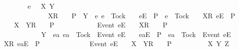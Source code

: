 \begin{isabellebody}
\ \ \ \ \ \ \ {\isacharparenleft}{\isasymAnd}e\ {\isasymrho}\ {\isasymsigma}\ X\ Y{\isachardot}\isanewline
\ \ \ \ \ \ \ \ \ \ \ {\isacharparenleft}{\isasymrho}\ {\isacharat}\ {\isacharbrackleft}X{\isacharbrackright}\isactrlsub R\ {\isacharhash}\ {\isasymsigma}\ {\isasymin}\ P\ {\isasymand}\ Y\ {\isasyminter}\ {\isacharbraceleft}e{\isachardot}\ e\ {\isasymnoteq}\ Tock\ {\isasymand}\ {\isasymrho}\ {\isacharat}\ {\isacharbrackleft}{\isacharbrackleft}e{\isacharbrackright}\isactrlsub E{\isacharbrackright}\ {\isasymin}\ P\ {\isasymor}\ e\ {\isacharequal}\ Tock\ {\isasymand}\ {\isasymrho}\ {\isacharat}\ {\isacharbrackleft}{\isacharbrackleft}X{\isacharbrackright}\isactrlsub R{\isacharcomma}\ {\isacharbrackleft}e{\isacharbrackright}\isactrlsub E{\isacharbrackright}\ {\isasymin}\ P{\isacharbraceright}\ {\isacharequal}\ {\isacharbraceleft}{\isacharbraceright}\ {\isasymLongrightarrow}\ {\isasymrho}\ {\isacharat}\ {\isacharbrackleft}X\ {\isasymunion}\ Y{\isacharbrackright}\isactrlsub R\ {\isacharhash}\ {\isasymsigma}\ {\isasymin}\ P{\isacharparenright}\ {\isasymLongrightarrow}\isanewline
\ \ \ \ \ \ \ \ \ \ \ {\isacharbrackleft}Event\ e{\isacharbrackright}\isactrlsub E\ {\isacharhash}\ {\isasymrho}\ {\isacharat}\ {\isacharbrackleft}X{\isacharbrackright}\isactrlsub R\ {\isacharhash}\ {\isasymsigma}\ {\isasymin}\ P\ {\isasymand}\isanewline
\ \ \ \ \ \ \ \ \ \ \ Y\ {\isasyminter}\ {\isacharbraceleft}ea{\isachardot}\ ea\ {\isasymnoteq}\ Tock\ {\isasymand}\ {\isacharbrackleft}Event\ e{\isacharbrackright}\isactrlsub E\ {\isacharhash}\ {\isasymrho}\ {\isacharat}\ {\isacharbrackleft}{\isacharbrackleft}ea{\isacharbrackright}\isactrlsub E{\isacharbrackright}\ {\isasymin}\ P\ {\isasymor}\ ea\ {\isacharequal}\ Tock\ {\isasymand}\ {\isacharbrackleft}Event\ e{\isacharbrackright}\isactrlsub E\ {\isacharhash}\ {\isasymrho}\ {\isacharat}\ {\isacharbrackleft}{\isacharbrackleft}X{\isacharbrackright}\isactrlsub R{\isacharcomma}\ {\isacharbrackleft}ea{\isacharbrackright}\isactrlsub E{\isacharbrackright}\ {\isasymin}\ P{\isacharbraceright}\ {\isacharequal}\ {\isacharbraceleft}{\isacharbraceright}\ {\isasymLongrightarrow}\isanewline
\ \ \ \ \ \ \ \ \ \ \ {\isacharbrackleft}Event\ e{\isacharbrackright}\isactrlsub E\ {\isacharhash}\ {\isasymrho}\ {\isacharat}\ {\isacharbrackleft}X\ {\isasymunion}\ Y{\isacharbrackright}\isactrlsub R\ {\isacharhash}\ {\isasymsigma}\ {\isasymin}\ P{\isacharparenright}\ {\isasymLongrightarrow}\isanewline
\ \ \ \ \ \ \ {\isacharparenleft}{\isasymAnd}{\isasymrho}\ {\isasymsigma}\ X\ Y\ Z{\isachardot}\isanewline

\end{isabellebody}
